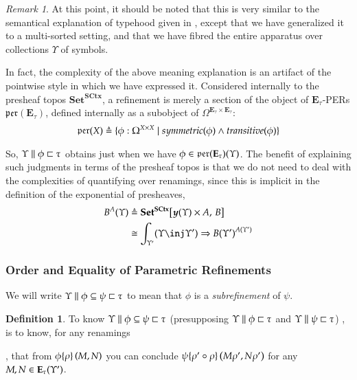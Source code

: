 \documentclass[11pt]{article}
\theoremstyle{definition}
\newtheorem{definition}[thm]{Definition}
\theoremstyle{remark}
\newtheorem{remark}[thm]{Remark}
\numberwithin{equation}{section}
\def\IModeColorName{MidnightBlue}
\def\OModeColorName{Maroon}
\def\IModeColorName{Black}
\def\OModeColorName{Black}
\newcommand\IMode[1]{{\color{\IModeColorName}{#1}}}
\newcommand\OMode[1]{{\color{\OModeColorName}{#1}}}
\newcommand\Member[2]{\IMode{#1}\in\IMode{#2}}
\newcommand\Sets{\mathbf{Set}}
\newcommand\SCtx{\mathbf{SCtx}}
\newcommand\Hom[3]{#1\!\left[#2,\,#3\right]}
\newcommand\Define[2]{\IMode{#1}\triangleq\OMode{#2}}
\newcommand\ADefine[2]{\IMode{#1}&\triangleq\OMode{#2}}
\newcommand\Yoneda[1]{\boldsymbol{y} (#1)}
\newcommand\Refines[3]{\IMode{#1}\parallel\IMode{#2}\sqsubset\OMode{#3}}
\newcommand\SubRefines[4]{\IMode{#1}\parallel\IMode{#2}\subseteq\IMode{#3}\sqsubset\OMode{#4}}
\newcommand\Exprs{\mathbf{E}}
\begin{document}
\begin{remark}

  At this point, it should be noted that this is very similar to the semantical
  explanation of typehood given in \cite{martin-lof:1979}, except that we have
  generalized it to a multi-sorted setting, and that we have fibred the entire
  apparatus over collections $\Upsilon$ of symbols.

  In fact, the complexity of the above meaning explanation is an artifact of
  the pointwise style in which we have expressed it. Considered internally to
  the presheaf topos $\Sets^\SCtx$, a refinement is merely a section of the
  object of $\Exprs_\tau$-PERs $\mathfrak{per}(\Exprs_\tau)$, defined
  internally as a subobject of $\Omega^{\Exprs_\tau\times\Exprs_\tau}$:
  \[
    \Define{
      \mathfrak{per}(X)
    }{
      \{ \phi : \Omega^{X\times X}
         \mid
         symmetric(\phi)
         \land transitive(\phi)
      \}
    }
  \]

  So, $\Refines{\Upsilon}{\phi}{\tau}$ obtains just when we have
  $\Member{\phi}{\mathfrak{per}(\Exprs_\tau)(\Upsilon)}$. The benefit of
  explaining such judgments in terms of the presheaf topos is that we do not
  need to deal with the complexities of quantifying over renamings, since this
  is implicit in the definition of the exponential of presheaves,
  \begin{align*}
    \ADefine{
      B^A(\Upsilon)
    }{
      \Hom{\Sets^\SCtx}{
        \Yoneda{\Upsilon}\times A
      }{
        B
      }
    }\\
    &\cong
    \OMode{
      \int_{\Upsilon'}
      (\Upsilon\inj\Upsilon')
      \Rightarrow
      {B(\Upsilon')}^{A(\Upsilon')}
    }
  \end{align*}

\end{remark}

\subsubsection{Order and Equality of Parametric Refinements}

We will write $\SubRefines{\Upsilon}{\phi}{\psi}{\tau}$ to mean that $\phi$ is
a \emph{subrefinement} of $\psi$.

\begin{definition}

  To know $\SubRefines{\Upsilon}{\phi}{\psi}{\tau}$ (presupposing
  $\Refines{\Upsilon}{\phi}{\tau}$ and $\Refines{\Upsilon}{\psi}{\tau}$) , is
  to know, for any renamings
  ,
  that from $\RefEquate{\phi}{\rho}{M}{N}$ you can conclude
  $\RefEquate{\psi}{\rho'\circ\rho}{M\rho'}{N\rho'}$ for any
  $\Member{M,N}{\Exprs_\tau(\Upsilon')}$.

\end{definition}
\end{document}
